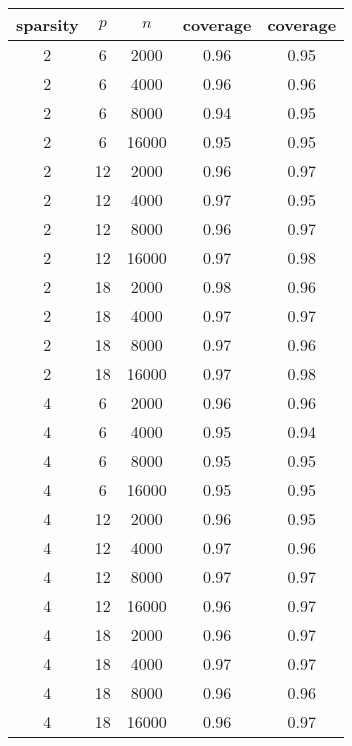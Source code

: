 \begin{table}[ht]
\centering
\begin{tabular}{|ccc|cc|}
  \hline
\hline
sparsity & $p$ & $n$ & coverage & coverage \\ 
  \hline
\hline
2 & 6 & 2000 & 0.96 & 0.95 \\ 
  2 & 6 & 4000 & 0.96 & 0.96 \\ 
  2 & 6 & 8000 & 0.94 & 0.95 \\ 
  2 & 6 & 16000 & 0.95 & 0.95 \\ 
   \hline
2 & 12 & 2000 & 0.96 & 0.97 \\ 
  2 & 12 & 4000 & 0.97 & 0.95 \\ 
  2 & 12 & 8000 & 0.96 & 0.97 \\ 
  2 & 12 & 16000 & 0.97 & 0.98 \\ 
   \hline
2 & 18 & 2000 & 0.98 & 0.96 \\ 
  2 & 18 & 4000 & 0.97 & 0.97 \\ 
  2 & 18 & 8000 & 0.97 & 0.96 \\ 
  2 & 18 & 16000 & 0.97 & 0.98 \\ 
   \hline
\hline
4 & 6 & 2000 & 0.96 & 0.96 \\ 
  4 & 6 & 4000 & 0.95 & 0.94 \\ 
  4 & 6 & 8000 & 0.95 & 0.95 \\ 
  4 & 6 & 16000 & 0.95 & 0.95 \\ 
   \hline
4 & 12 & 2000 & 0.96 & 0.95 \\ 
  4 & 12 & 4000 & 0.97 & 0.96 \\ 
  4 & 12 & 8000 & 0.97 & 0.97 \\ 
  4 & 12 & 16000 & 0.96 & 0.97 \\ 
   \hline
4 & 18 & 2000 & 0.96 & 0.97 \\ 
  4 & 18 & 4000 & 0.97 & 0.97 \\ 
  4 & 18 & 8000 & 0.96 & 0.96 \\ 
  4 & 18 & 16000 & 0.96 & 0.97 \\ 
   \hline
\hline
\end{tabular}
\end{table}
